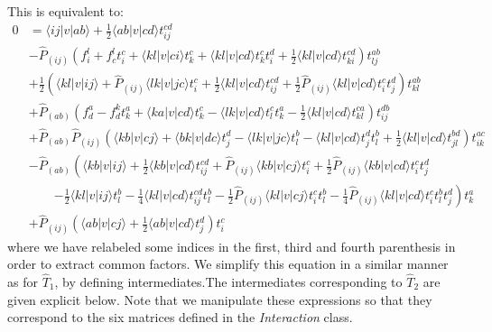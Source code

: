 This is equivalent to:
\begin{align}
0&=\langle ij|v|ab\rangle+\frac{1}{2}\langle ab|v|cd\rangle t_{ij}^{cd}\nonumber\\
&-\hat{P}_{(ij)}\left(f_i^l + f_c^lt_i^c + \langle kl|v|ci\rangle t_k^c + \langle kl|v|cd\rangle t_k^ct_i^d+\frac{1}{2}\langle kl|v|cd\rangle t_{ki}^{cd}\right)t_{lj}^{ab}\nonumber\\
&+\frac{1}{2}\left(\langle kl|v|ij\rangle +\hat{P}_{(ij)}\langle lk|v|jc\rangle t_i^c+\frac{1}{2}\langle kl|v|cd\rangle t_{ij}^{cd}+\frac{1}{2}\hat{P}_{(ij)}\langle kl|v|cd\rangle t_i^ct_j^d\right)t_{kl}^{ab}\nonumber\\
&+\hat{P}_{(ab)}\left(f_d^a-f_d^kt_k^a+\langle ka|v|cd\rangle t_k^c-\langle lk|v|cd\rangle t_l^ct_k^a-\frac{1}{2}\langle kl|v|cd\rangle t_{kl}^{ca}\right)t_{ij}^{db}\nonumber\\
&+\hat{P}_{(ab)}\hat{P}_{(ij)}\left(\langle kb|v|cj\rangle + \langle bk|v|dc\rangle t_j^d-\langle lk|v|jc\rangle t_l^b-\langle kl|v|cd\rangle t_j^dt_l^b+\frac{1}{2}\langle kl|v|cd\rangle t_{jl}^{bd}\right)t_{ik}^{ac}\nonumber\\
&-\hat{P}_{(ab)}\left(\langle kb|v|ij\rangle +\frac{1}{2}\langle kb|v|cd\rangle t_{ij}^{cd}+\hat{P}_{(ij)}\langle kb|v|cj\rangle t_i^c+\frac{1}{2}\hat{P}_{(ij)}\langle kb|v|cd\rangle t_i^ct_j^d\right.\nonumber\\
&\phantom{++}\left.-\frac{1}{2}\langle kl|v|ij\rangle t_l^b-\frac{1}{4}\langle kl|v|cd\rangle t_{ij}^{cd}t_l^b-\frac{1}{2}\hat{P}_{(ij)}\langle kl|v|cj\rangle t_i^ct_l^b-\frac{1}{4}\hat{P}_{(ij)}\langle kl|v|cd\rangle t_i^ct_l^bt_j^d\right)t_k^a\nonumber\\
&+\hat{P}_{(ij)}\left(\langle ab|v|cj\rangle +\frac{1}{2}\langle ab|v|cd\rangle t_j^d\right)t_i^c
\label{eq:impl:t2amplitude2}
\end{align}
where we have relabeled some indices in the first, third and fourth parenthesis in order to extract common factors. We simplify this equation in a similar manner as for $\hat{T}_1$, by defining intermediates.The intermediates corresponding to $\hat{T}_2$ are given explicit below. Note that we manipulate these expressions so that they correspond to the six matrices defined in the \emph{Interaction} class.

